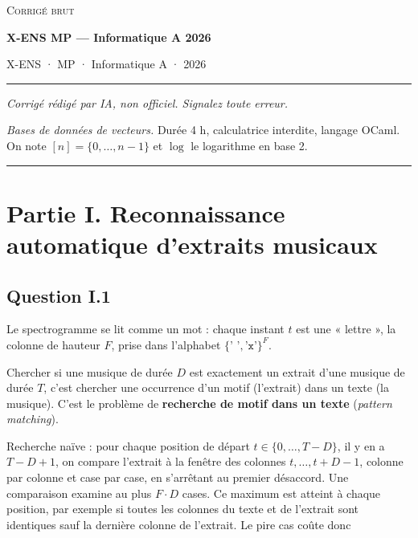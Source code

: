 \documentclass[11pt,a4paper]{article}
\begin{document}
\thispagestyle{plain}
\begin{center}
  {\small\scshape Corrigé brut}\par\smallskip
  {\LARGE\bfseries X-ENS MP — Informatique A 2026\par}\medskip
  {\large X-ENS · MP · Informatique A · 2026\par}
\end{center}
\vspace{2pt}\hrule\vspace{8pt}

\emph{Corrigé rédigé par IA, non officiel. Signalez toute erreur.}

\emph{Bases de données de vecteurs.} Durée 4 h, calculatrice interdite, langage OCaml. On note \([n]=\{0,\dots,n-1\}\) et \(\log\) le logarithme en base 2.

\begin{center}\rule{0.5\linewidth}{0.5pt}\end{center}

\hypertarget{partie-i.-reconnaissance-automatique-dextraits-musicaux}{%
\section{Partie I. Reconnaissance automatique d'extraits musicaux}\label{partie-i.-reconnaissance-automatique-dextraits-musicaux}}

\hypertarget{question-i.1}{%
\subsection{Question I.1}\label{question-i.1}}

Le spectrogramme se lit comme un mot : chaque instant \(t\) est une « lettre », la colonne de hauteur \(F\), prise dans l'alphabet \(\{\texttt{' '},\texttt{'x'}\}^F\).

Chercher si une musique de durée \(D\) est exactement un extrait d'une musique de durée \(T\), c'est chercher une occurrence d'un motif (l'extrait) dans un texte (la musique). C'est le problème de \textbf{recherche de motif dans un texte} (\emph{pattern matching}).

Recherche naïve : pour chaque position de départ \(t\in\{0,\dots,T-D\}\), il y en a \(T-D+1\), on compare l'extrait à la fenêtre des colonnes \(t,\dots,t+D-1\), colonne par colonne et case par case, en s'arrêtant au premier désaccord. Une comparaison examine au plus \(F\cdot D\) cases. Ce maximum est atteint à chaque position, par exemple si toutes les colonnes du texte et de l'extrait sont identiques sauf la dernière colonne de l'extrait. Le pire cas coûte donc
\end{document}
